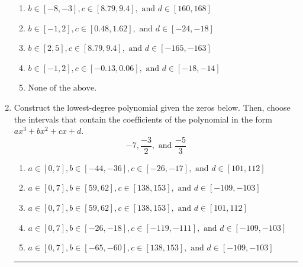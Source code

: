 \documentclass[14pt]{extbook}
\newcommand{\litem}[1]{\item#1\hspace*{-1cm}\rule{\textwidth}{0.4pt}}
\begin{document}
\begin{enumerate}
{\begin{enumerate}[label=\Alph*.]
\item \( b \in [-8, -3], c \in [8.79, 9.4], \text{ and } d \in [160, 168] \)
\item \( b \in [-1, 2], c \in [0.48, 1.62], \text{ and } d \in [-24, -18] \)
\item \( b \in [2, 5], c \in [8.79, 9.4], \text{ and } d \in [-165, -163] \)
\item \( b \in [-1, 2], c \in [-0.13, 0.06], \text{ and } d \in [-18, -14] \)
\item \( \text{None of the above.} \)

\end{enumerate} }
\litem{
Construct the lowest-degree polynomial given the zeros below. Then, choose the intervals that contain the coefficients of the polynomial in the form $ax^3+bx^2+cx+d$.\[ -7, \frac{-3}{2}, \text{ and } \frac{-5}{3} \]\begin{enumerate}[label=\Alph*.]
\item \( a \in [0, 7], b \in [-44, -36], c \in [-26, -17], \text{ and } d \in [101, 112] \)
\item \( a \in [0, 7], b \in [59, 62], c \in [138, 153], \text{ and } d \in [-109, -103] \)
\item \( a \in [0, 7], b \in [59, 62], c \in [138, 153], \text{ and } d \in [101, 112] \)
\item \( a \in [0, 7], b \in [-26, -18], c \in [-119, -111], \text{ and } d \in [-109, -103] \)
\item \( a \in [0, 7], b \in [-65, -60], c \in [138, 153], \text{ and } d \in [-109, -103] \)


\end{enumerate}}
\end{enumerate}
\end{document}
